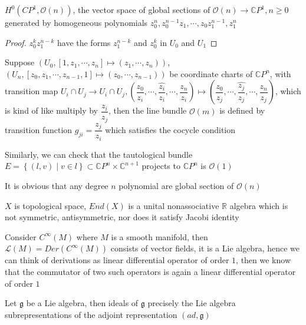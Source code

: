 \documentclass[main]{subfiles}
\begin{document}
\begin{proposition}
$H^0\left(CP^1,\mathcal{O}(n)\right)$, the vector space of global sections of $\mathcal{O}(n)\to\mathbb CP^1,n\geq0$  generated by homogeneous polynomials $z_0^n,z_0^{n-1}z_1,\cdots,z_0z_1^{n-1},z_1^{n}$
\end{proposition}

\begin{proof}
$z_0^kz_1^{n-k}$ have the forms $z_1^{n-k}$ and $z_0^k$ in $U_0$ and $U_1$
\end{proof}

\begin{example}
Suppose $\left(U_0,[1,z_1,\cdots,z_n]\mapsto(z_1,\cdots,z_n)\right)$, $\left(U_n,[z_0,z_1,\cdots,z_{n-1},1]\mapsto(z_0,\cdots,z_{n-1})\right)$ be coordinate charts of $\mathbb CP^n$, with transition map $U_i\cap U_j\to U_i\cap U_j, \left(\dfrac{z_0}{z_i},\cdots,\widehat{\dfrac{z_i}{z_i}},\cdots,\dfrac{z_n}{z_i}\right)\mapsto\left(\dfrac{z_0}{z_j},\cdots,\widehat{\dfrac{z_j}{z_j}},\cdots,\dfrac{z_n}{z_j}\right)$, which is kind of like multiply by $\dfrac{z_i}{z_j}$, then the line bundle $\mathcal{O}(m)$ is defined by transition function $g_{ji}=\dfrac{z_j}{z_i}$ which satisfies the cocycle condition \par
Similarly, we can check that the tautological bundle $E=\left\{(l,v)\middle| v\in l\right\}\subset\mathbb CP^n\times\mathbb C^{n+1}$ projects to $\mathbb CP^n$ is $\mathcal{O}(1)$ \par
It is obvious that any degree $n$ polynomial are global section of $\mathcal{O}(n)$
\end{example}

\begin{example}
$X$ is topological space, $End(X)$ is a unital nonassociative $\mathbb R$ algebra which is not symmetric, antisymmetric, nor does it satisfy Jacobi identity
\end{example}

\begin{example}
Consider $C^\infty(M)$ where $M$ is a smooth manifold, then $\mathcal{L}(M)=Der(C^\infty(M))$ consists of vector fields, it is a Lie algebra, hence we can think of derivations as linear differential operator of order $1$, then we know that the commutator of two such operators is again a linear differential operator of order $1$
\end{example}

\begin{example}
Let $\mathfrak{g}$ be a Lie algebra, then ideals of $\mathfrak{g}$ precisely the Lie algebra subrepresentations of the adjoint representation $(ad,\mathfrak{g})$
\end{example}
\end{document}

